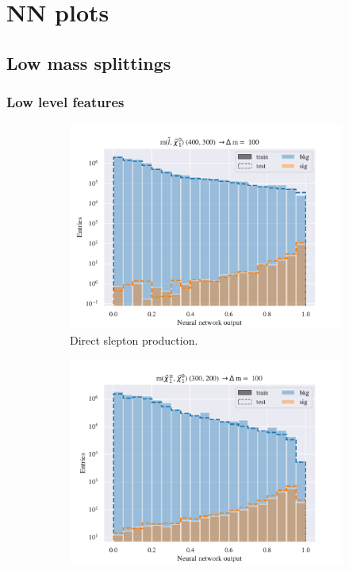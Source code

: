 \chapter{NN plots}
\label{sec:appNNplots}

\section{Low mass splittings}

\subsection{Low level features}

\begin{figure}[H]
    \centering
    \begin{subfigure}[t!]{0.49\textwidth}
        \includegraphics[width = \textwidth]{Figures/SlepSlep/ML/NN/Low_level/Low/scaled_train_test_395984.pdf}
        \caption{Direct slepton production.}
        \label{fig:}
    \end{subfigure}
    \begin{subfigure}[t!]{0.49\textwidth}
        \includegraphics[width = \textwidth]{Figures/SlepSnu/NN/Low_level/Low/scaled_train_test_397115.pdf}

\end{subfigure}
\end{figure}
